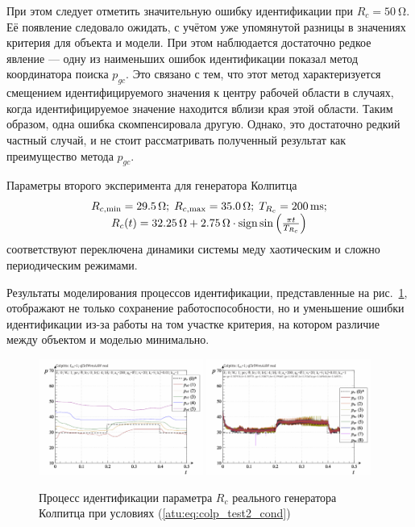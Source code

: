 При этом следует отметить значительную ошибку идентификации при $R_c = \SI{50}{\ohm}$.
Её появление следовало ожидать, с учётом уже упомянутой разницы
в значениях критерия для объекта и модели.
При этом наблюдается достаточно редкое явление --- одну из
наименьших ошибок идентификации показал метод координатора поиска
$p_{gc}$. Это связано с тем, что этот метод характеризуется
смещением идентифицируемого значения к центру рабочей области
в случаях, когда идентифицируемое значение находится вблизи края
этой области. Таким образом, одна ошибка скомпенсировала другую.
Однако, это достаточно редкий частный случай, и не стоит
рассматривать полученный результат как преимущество метода $p_{gc}$.


Параметры второго эксперимента для генератора Колпитца
%
\begin{equation}
  \begin{array}{c}
    R_{c,\min} = \SI{29.5}{\ohm};
    \;
    R_{c,\max} = \SI{35.0}{\ohm};
    \;
    T_{R_c} = \SI{200}{\milli\second};
  \\
    R_c(t) = \SI{32.25}{\ohm} + \SI{2.75}{\ohm} \cdot \operatorname*{sign} \sin \left( \frac{\pi t}{T_{R_c}}  \right)
  \end{array}
  \label{atu:eq:colp_test2_cond}
\end{equation}
%
соответствуют переключена динамики системы меду хаотическим
и сложно периодическим режимами.

Результаты моделирования процессов идентификации,
представленные на рис.~\ref{atu:f:colp_r_id_2},
отображают не только сохранение работоспособности,
но и уменьшение ошибки идентификации из-за работы на том участке критерия,
на котором различие между объектом и моделью минимально.


\begin{figure}[htb!]
  \centerline{
    \includegraphics[width=0.48\textwidth]{p/r/colp_real_id-p_t_pi_ql3rlWvnAAW_real_d_1.png}
    \hfill
    \includegraphics[width=0.48\textwidth]{p/r/colp_real_id-p_t_p_ql3rlWvnAAW_real_d_1.png}
  }
  \caption{Процесс идентификации параметра $R_c$ реального генератора Колпитца при условиях (\ref{atu:eq:colp_test2_cond})}
  \label{atu:f:colp_r_id_2}
\end{figure}



